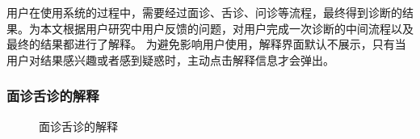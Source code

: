 用户在使用系统的过程中，需要经过面诊、舌诊、问诊等流程，最终得到诊断的结果。为本文根据用户研究中用户反馈的问题，对用户完成一次诊断的中间流程以及最终的结果都进行了解释。
为避免影响用户使用，解释界面默认不展示，只有当用户对结果感兴趣或者感到疑惑时，主动点击解释信息才会弹出。

\subsubsection{面诊舌诊的解释}

\begin{figure}[htbp]   
    \centering
    \caption{面诊舌诊的解释}
    \label{fig:face_diags}
\end{figure}

